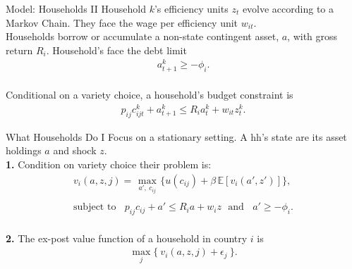 \documentclass[9pt,pdftex,aspectratio=1610]{beamer}
\theoremstyle{definition}
\begin{document}

\begin{frame}[t]{Model: Households II}
\smallskip
Household $k$'s efficiency units $z_t$ evolve according to a Markov Chain. They face the wage per efficiency unit $w_{it}$.\\
\bigskip
\medskip
Households borrow or accumulate a non-state contingent asset, $a$, with gross return $R_{i}$. Household's face the debt limit
\begin{align*}
a^k_{t+1} \geq - \phi_{i}.
\end{align*}\\
\bigskip
\medskip
Conditional on a variety choice, a household's budget constraint is
\begin{align*}
p_{ij}c^k_{ijt} +  a^k_{t+1} \leq    R_{i} a^k_{t} + w_{it} z^k_{t}.
\end{align*}
\end{frame}



\begin{frame}[t]{What Households Do I}
Focus on a stationary setting. A hh's state are its asset holdings $a$ and shock $z$.\\
\smallskip
\textbf{1.} Condition on variety choice their problem is:
\begin{align}
v_{i}(a, z, j) =   \max_{\ a', \ c_{ij}  \ }\bigg  \{ u(c_{ij})  + \beta \, \mathbb{E} [v_{i}(a', z')]  \bigg\}, \nonumber \\
\nonumber \\
\mbox{subject to}  \ \ \  \  p_{ij}c_{ij} +  a' \leq    R_{i} a + w_{i} z \ \ \  \mbox{and} \ \ \ \ a' \geq - \phi_{i}. \nonumber
\end{align}\\
\bigskip
\textbf{2.} The ex-post value function of a household in country $i$ is
\begin{align}
\max_{j} \big  \{ \  v_{i}(a, z, j) + \epsilon_{j}  \ \big \}. \nonumber
\end{align}
\end{frame}

\end{document}
